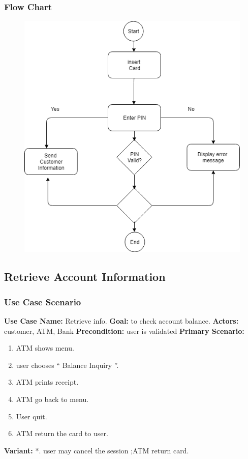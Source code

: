\documentclass{article}
\begin{document}
		\newpage\subsubsection{Flow Chart}
		\begin{figure}[h!]
			\begin{center}
				\includegraphics[height=\linewidth]{img/validate_flowchart.png}
			\end{center}
		\end{figure}
	
	
	\newpage\subsection{Retrieve Account Information}
	\subsubsection{Use Case Scenario}
		\textbf{Use Case Name:}	Retrieve info.
		\newline\textbf{Goal:} to check account balance.
		\newline\textbf{Actors:} customer, ATM, Bank 	
		\newline\textbf{Precondition:} user is validated 	
		\newline\textbf{Primary Scenario:}	
			\begin{enumerate}[label*=\arabic*.]
				\item ATM shows menu.
				\item user chooses “ Balance Inquiry ”.
				\item ATM prints receipt.
				\item ATM go back to menu.
				\item User quit.
				\item ATM return the card to user.
			\end{enumerate}
		\textbf{Variant:}\newline	
			\hspace*{5mm}*. user may cancel the session ;ATM return card.
\end{document}
